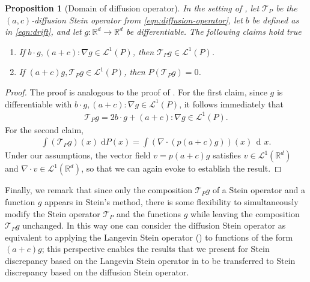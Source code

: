 \documentclass[12pt,paper=letter]{scrreprt}
\newtheorem{proposition}{Proposition}[chapter]
\newcommand{\dee}{\mathop{\mathrm{d}\!}}
\newcommand{\dx}{\,\dee x}
\def\reals{\mathbb{R}} %
\newcommand{\grad}{\nabla} %
\newcommand{\TP}{\mathcal{T}_P}
\newcommand{\Lp}[1][p]{\mathcal{L}^{#1}}
\begin{document}
\begin{proposition}[Domain of diffusion operator] \label{classical_mean_zero}
In the setting of , let $\TP$ be the $(a,c)$-diffusion Stein operator from \cref{eqn:diffusion-operator}, let $b$ be defined as in \cref{eqn:drift}, 
and let $g : \reals^d \rightarrow \reals^d$ be differentiable.
The following claims hold true
\begin{enumerate}
\item If $b \cdot g, (a+c) : \grad g \in \Lp[1](P)$, 
then $\TP g \in \Lp[1](P)$.
\item If $(a+c) g , \TP g \in \Lp[1](P)$, then $P(\TP g) = 0$.
\end{enumerate}
\end{proposition}
\begin{proof}
The proof is analogous to the proof of .
For the first claim, since $g$ is differentiable with $ b \cdot g, (a+c) : \grad g \in \Lp[1](P)$, it follows immediately that 
\begin{align*}
\TP g
	=
2 b \cdot g 
	+
(a+c) : \grad g
	\in
\Lp[1](P).
\end{align*}
For the second claim, 
\begin{align*}
\int (\TP g)(x) \; \mathrm{d}P(x) 
 = \int (\nabla \cdot (p (a + c) g))(x) \dx .
\end{align*}
Under our assumptions, the vector field $v = p(a+c)g$ satisfies $v \in \mathcal{L}^1(\mathbb{R}^d)$ and $\nabla \cdot v \in \mathcal{L}^1(\mathbb{R}^d)$, so that we can again evoke  to establish the result.





\end{proof}


Finally, we remark that since only the composition $\mathcal{T}_P g$ of a Stein operator and a function $g$ appears in Stein's method, there is some flexibility to simultaneously modify the Stein operator $\mathcal{T}_P$ and the functions $g$ while leaving the composition $\mathcal{T}_P g$ unchanged.
In this way one can consider the diffusion Stein operator as equivalent to applying the Langevin Stein operator () to functions of the form $(a+c)g$; this perspective enables the results that we present for Stein discrepancy based on the Langevin Stein operator in  to be transferred to Stein discrepancy based on the diffusion Stein operator.
\end{document}
